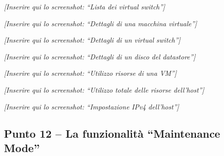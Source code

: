 \documentclass[11pt,a4paper]{article}
\begin{document}
\begin{placeholder}
\centering
\vspace{2cm}
\textit{[Inserire qui lo screenshot: ``Lista dei virtual switch'']}
\vspace{2cm}
\end{placeholder}

\begin{placeholder}
\centering
\vspace{2cm}
\textit{[Inserire qui lo screenshot: ``Dettagli di una macchina virtuale'']}
\vspace{2cm}
\end{placeholder}

\begin{placeholder}
\centering
\vspace{2cm}
\textit{[Inserire qui lo screenshot: ``Dettagli di un virtual switch'']}
\vspace{2cm}
\end{placeholder}

\begin{placeholder}
\centering
\vspace{2cm}
\textit{[Inserire qui lo screenshot: ``Dettagli di un disco del datastore'']}
\vspace{2cm}
\end{placeholder}

\begin{placeholder}
\centering
\vspace{2cm}
\textit{[Inserire qui lo screenshot: ``Utilizzo risorse di una VM'']}
\vspace{2cm}
\end{placeholder}

\begin{placeholder}
\centering
\vspace{2cm}
\textit{[Inserire qui lo screenshot: ``Utilizzo totale delle risorse dell'host'']}
\vspace{2cm}
\end{placeholder}

\begin{placeholder}
\centering
\vspace{2cm}
\textit{[Inserire qui lo screenshot: ``Impostazione IPv4 dell'host'']}
\vspace{2cm}
\end{placeholder}

\subsection{Punto 12 -- La funzionalità ``Maintenance Mode''}
\end{document}
